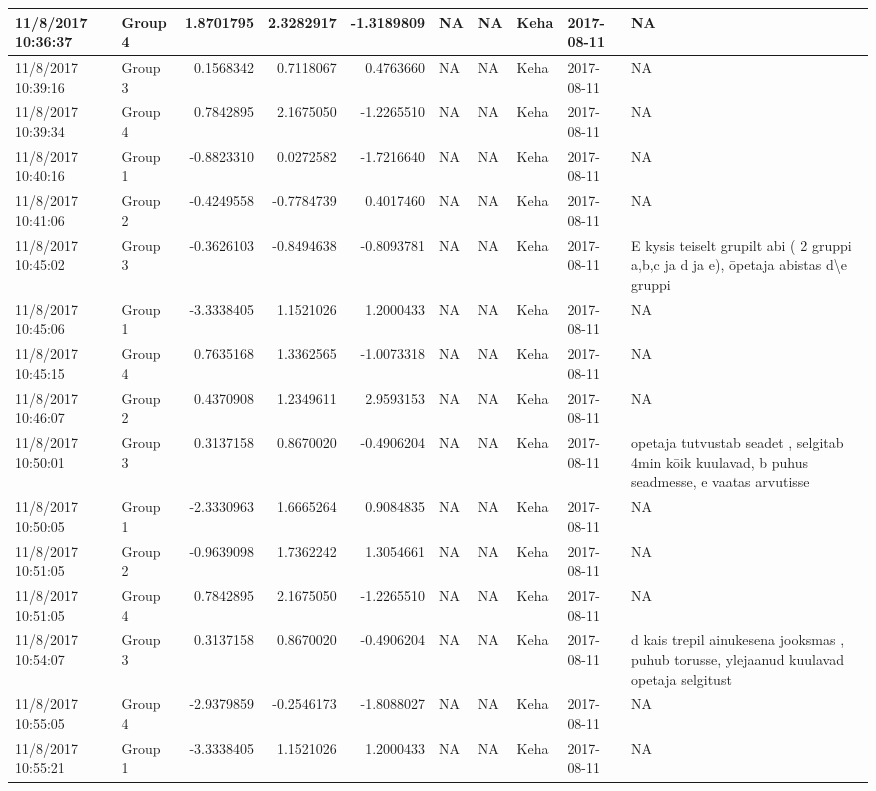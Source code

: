 \documentclass[]{article}
\begin{document}
\begin{tabular}{l|l|r|r|r|l|l|l|l|l}
\hline
11/8/2017 10:36:37 & Group 4 & 1.8701795 & 2.3282917 & -1.3189809 & NA & NA & Keha & 2017-08-11 & NA\\
\hline
11/8/2017 10:39:16 & Group 3 & 0.1568342 & 0.7118067 & 0.4763660 & NA & NA & Keha & 2017-08-11 & NA\\
\hline
11/8/2017 10:39:34 & Group 4 & 0.7842895 & 2.1675050 & -1.2265510 & NA & NA & Keha & 2017-08-11 & NA\\
\hline
11/8/2017 10:40:16 & Group 1 & -0.8823310 & 0.0272582 & -1.7216640 & NA & NA & Keha & 2017-08-11 & NA\\
\hline
11/8/2017 10:41:06 & Group 2 & -0.4249558 & -0.7784739 & 0.4017460 & NA & NA & Keha & 2017-08-11 & NA\\
\hline
11/8/2017 10:45:02 & Group 3 & -0.3626103 & -0.8494638 & -0.8093781 & NA & NA & Keha & 2017-08-11 & E kysis teiselt grupilt abi ( 2 gruppi a,b,c ja d ja e), ōpetaja abistas d\textbackslash{}e gruppi\\
\hline
11/8/2017 10:45:06 & Group 1 & -3.3338405 & 1.1521026 & 1.2000433 & NA & NA & Keha & 2017-08-11 & NA\\
\hline
11/8/2017 10:45:15 & Group 4 & 0.7635168 & 1.3362565 & -1.0073318 & NA & NA & Keha & 2017-08-11 & NA\\
\hline
11/8/2017 10:46:07 & Group 2 & 0.4370908 & 1.2349611 & 2.9593153 & NA & NA & Keha & 2017-08-11 & NA\\
\hline
11/8/2017 10:50:01 & Group 3 & 0.3137158 & 0.8670020 & -0.4906204 & NA & NA & Keha & 2017-08-11 & opetaja tutvustab seadet , selgitab 4min kōik kuulavad, b puhus seadmesse, e vaatas arvutisse\\
\hline
11/8/2017 10:50:05 & Group 1 & -2.3330963 & 1.6665264 & 0.9084835 & NA & NA & Keha & 2017-08-11 & NA\\
\hline
11/8/2017 10:51:05 & Group 2 & -0.9639098 & 1.7362242 & 1.3054661 & NA & NA & Keha & 2017-08-11 & NA\\
\hline
11/8/2017 10:51:05 & Group 4 & 0.7842895 & 2.1675050 & -1.2265510 & NA & NA & Keha & 2017-08-11 & NA\\
\hline
11/8/2017 10:54:07 & Group 3 & 0.3137158 & 0.8670020 & -0.4906204 & NA & NA & Keha & 2017-08-11 & d kais trepil ainukesena  jooksmas , puhub torusse, ylejaanud kuulavad opetaja selgitust\\
\hline
11/8/2017 10:55:05 & Group 4 & -2.9379859 & -0.2546173 & -1.8088027 & NA & NA & Keha & 2017-08-11 & NA\\
\hline
11/8/2017 10:55:21 & Group 1 & -3.3338405 & 1.1521026 & 1.2000433 & NA & NA & Keha & 2017-08-11 & NA\\

\end{tabular}
\end{document}
